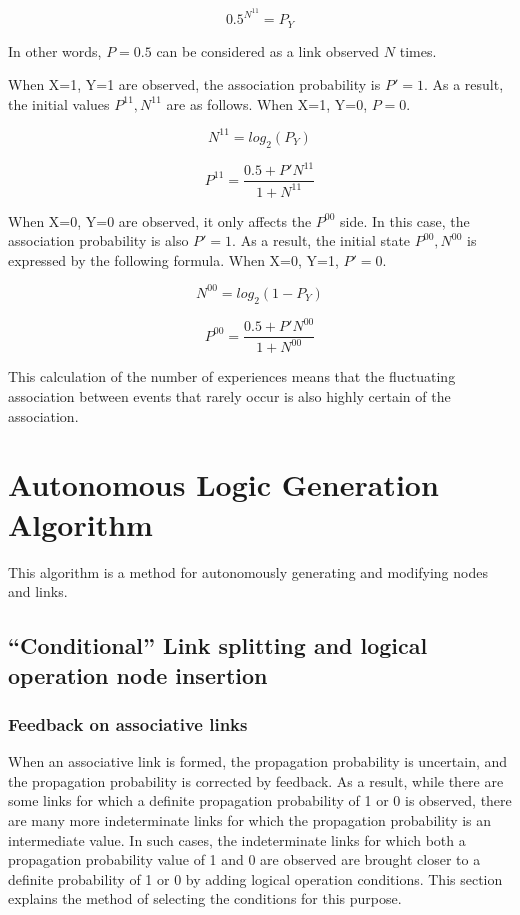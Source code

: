 \documentclass[12pt]{article}
\begin{document}
\[ 0.5^{N^{11}}= P_Y\]

In other words, \(P=0.5\) can be considered as a link observed \(N\)
times.

When X=1, Y=1 are observed, the association probability is \(P'=1\). As
a result, the initial values \hspace{0pt}\hspace{0pt}\(P^{11}, N^{11}\)
are as follows. When X=1, Y=0, \(P=0\).

\[N^{11}=log_2(P_Y)\]

\[P^{11}=\frac{0.5+ P'N^{11}}{1+N^{11}}\]

When X=0, Y=0 are observed, it only affects the \(P^{00}\) side. In this
case, the association probability is also \(P'=1\). As a result, the
initial state \(P^{00}, N^{00}\) is expressed by the following formula.
When X=0, Y=1, \(P'=0\).

\[N^{00}=log_2(1-P_Y)\]

\[P^{00}=\frac{0.5+ P'N^{00}}{1+N^{00}}\]

This calculation of the number of experiences means that the fluctuating
association between events that rarely occur is also highly certain of
the association.

\section{Autonomous Logic Generation Algorithm}\label{autonomous-logic-generation-algorithm-1}

This algorithm is a method for autonomously generating and modifying
nodes and links.

\subsection{``Conditional'' Link splitting and logical operation node insertion}\label{conditional-link-splitting-and-logical-operation-node-insertion-1}

\subsubsection{Feedback on associative links}\label{feedback-on-associative-links}

When an associative link is formed, the propagation probability is
uncertain, and the propagation probability is corrected by feedback. As
a result, while there are some links for which a definite propagation
probability of 1 or 0 is observed, there are many more indeterminate
links for which the propagation probability is an intermediate value. In
such cases, the indeterminate links for which both a propagation
probability value of 1 and 0 are observed are brought closer to a
definite probability of 1 or 0 by adding logical operation conditions.
This section explains the method of selecting the conditions for this
purpose.
\end{document}
